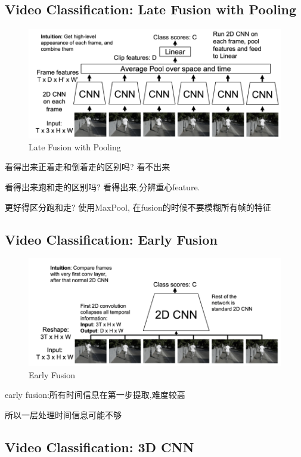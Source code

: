 \subsection{Video Classification: Late Fusion with Pooling}

\begin{figure}[htbp]
    \centering
    \includegraphics[scale=0.25]{figures/LF_pool.png}
    \caption{Late Fusion with Pooling}
\end{figure}

看得出来正着走和倒着走的区别吗? 看不出来

看得出来跑和走的区别吗? 看得出来,分辨重心feature.

更好得区分跑和走? 使用MaxPool, 在fusion的时候不要模糊所有帧的特征

\subsection{Video Classification: Early Fusion}

\begin{figure}[htbp]
    \centering
    \includegraphics[scale=0.25]{figures/EF.png}
    \caption{Early Fusion}
\end{figure}

early fusion:所有时间信息在第一步提取,难度较高

所以一层处理时间信息可能不够

\subsection{Video Classification: 3D CNN}

